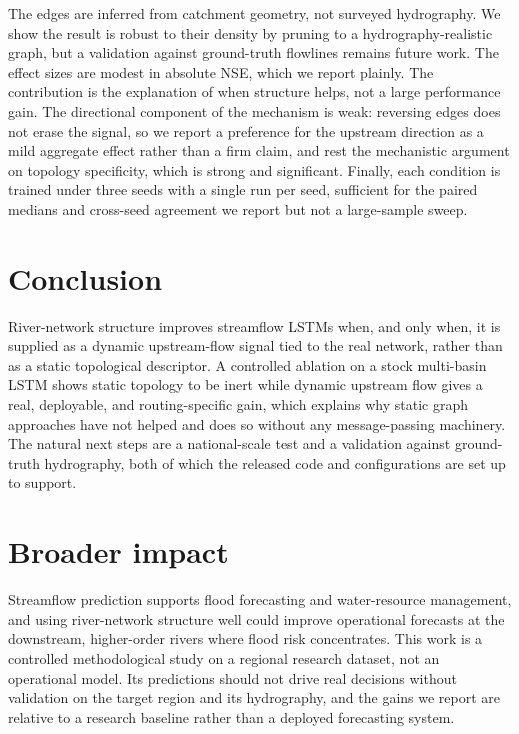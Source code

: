 \documentclass[11pt]{article}
\begin{document}
The edges are inferred from catchment geometry, not surveyed hydrography. We show the result is
robust to their density by pruning to a hydrography-realistic graph, but a validation against
ground-truth flowlines remains future work. The effect sizes are modest in absolute NSE, which we
report plainly. The contribution is the explanation of when structure helps, not a large performance
gain. The directional component of the mechanism is weak: reversing edges does not erase the signal,
so we report a preference for the upstream direction as a mild aggregate effect rather than a firm
claim, and rest the mechanistic argument on topology specificity, which is strong and significant.
Finally, each condition is trained under three seeds with a single run per seed, sufficient for the
paired medians and cross-seed agreement we report but not a large-sample sweep.

\section{Conclusion}

River-network structure improves streamflow LSTMs when, and only when, it is supplied as a dynamic
upstream-flow signal tied to the real network, rather than as a static topological descriptor. A
controlled ablation on a stock multi-basin LSTM shows static topology to be inert while dynamic
upstream flow gives a real, deployable, and routing-specific gain, which explains why static graph
approaches have not helped and does so without any message-passing machinery. The natural next steps
are a national-scale test and a validation against ground-truth hydrography, both of which the
released code and configurations are set up to support.

\section*{Broader impact}

Streamflow prediction supports flood forecasting and water-resource management, and using river-network
structure well could improve operational forecasts at the downstream, higher-order rivers where flood
risk concentrates. This work is a controlled methodological study on a regional research dataset, not
an operational model. Its predictions should not drive real decisions without validation on the target
region and its hydrography, and the gains we report are relative to a research baseline rather than a
deployed forecasting system.
\end{document}
